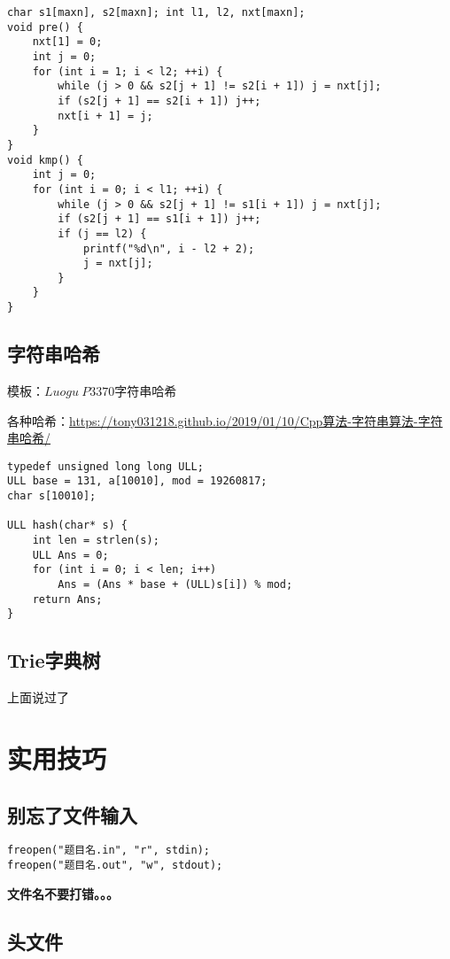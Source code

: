 \documentclass[UTF8]{ctexart}
\begin{document}
\begin{lstlisting}
char s1[maxn], s2[maxn]; int l1, l2, nxt[maxn];
void pre() {
    nxt[1] = 0;
    int j = 0;
    for (int i = 1; i < l2; ++i) {
        while (j > 0 && s2[j + 1] != s2[i + 1]) j = nxt[j];
        if (s2[j + 1] == s2[i + 1]) j++;
        nxt[i + 1] = j;
    }
}
void kmp() {
    int j = 0;
    for (int i = 0; i < l1; ++i) {
        while (j > 0 && s2[j + 1] != s1[i + 1]) j = nxt[j];
        if (s2[j + 1] == s1[i + 1]) j++;
        if (j == l2) {
            printf("%d\n", i - l2 + 2);
            j = nxt[j];
        }
    }
}
\end{lstlisting}

\subsection{字符串哈希}

模板：$Luogu\ P3370$字符串哈希

各种哈希：\url{https://tony031218.github.io/2019/01/10/Cpp算法-字符串算法-字符串哈希/}

\begin{lstlisting}
typedef unsigned long long ULL;
ULL base = 131, a[10010], mod = 19260817;
char s[10010];

ULL hash(char* s) {
    int len = strlen(s);
    ULL Ans = 0;
    for (int i = 0; i < len; i++)
        Ans = (Ans * base + (ULL)s[i]) % mod;
    return Ans;
}
\end{lstlisting}

\subsection{Trie字典树}

上面说过了


\section{实用技巧}

\subsection{别忘了文件输入}

\begin{lstlisting}
freopen("题目名.in", "r", stdin);
freopen("题目名.out", "w", stdout);
\end{lstlisting}

\textbf{文件名不要打错。。。}

\subsection{头文件}
\end{document}
